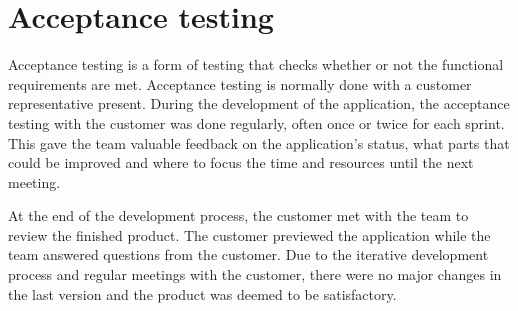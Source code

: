 \section{Acceptance testing}
\label{sec:acceptance}
Acceptance testing is a form of testing that checks whether or not the functional requirements are met. Acceptance testing is normally done with a customer representative present. During the development of the application, the acceptance testing with the customer was done regularly, often once or twice for each sprint. This gave the team valuable feedback on the application's status, what parts that could be improved and where to focus the time and resources until the next meeting.

At the end of the development process, the customer met with the team to review the finished product. The customer previewed the application while the team answered questions from the customer. Due to the iterative development process and regular meetings with the customer, there were no major changes in the last version and the product was deemed to be satisfactory.